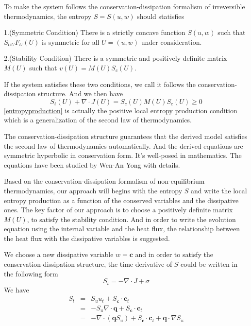 \documentclass[a4paper]{article}
\begin{document}
To make the system follows the conservation-dissipation formalism of irreversible thermodynamics, the entropy $S = S(u,w)$ should statisfies

1.(Symmetric Condition) There is a strictly concave function $S(u,w)$ such that $S_{UU} F_U(U)$ is symmetric for all $U=(u,w)$ under consideration.

2.(Stability Condition) There is a symmetric and positively definite matrix $M(U)$ such that $v(U)=M(U)S_c(U)$.

If the system satisfies these two conditions, we call it follows the conservation-dissipation structure. And we then have
\begin{equation}\label{entropyproduction}
S_t(U)+\nabla \cdot J(U)=S_c(U)M(U)S_c(U) \ge 0
\end{equation}
\eqref{entropyproduction} is actually the positive local entropy production condition which is a generalization of the second law of thermodynamics.

The  conservation-dissipation structure guarantees that the derived model satisfies the second law of thermodynamics automatically. And the derived equations are symmetric hyperbolic in conservation form. It's well-posed in mathematics\cite{friedrichs1971systems}. The equations have been studied by Wen-An Yong with details\cite{yong2008interesting,yong1999singular,kawashima2004dissipative}.


Based on the conservation-dissipation formalism of non-equilibrium thermodynamics, our approach will begins with the entropy $S$ and write the local entropy production as a function of the conserved variables and the dissipative ones. The key factor of our approach is to choose a positively definite matrix $M(U)$, to satisfy the stability condition. And in order to write the evolution equation using the internal variable and the heat flux, the relationship between the heat flux with the dissipative variables is suggested. 

We choose a new dissipative variable $w=\mathbf{c}$ and in order to satisfy the conservation-dissipation structure, the time derivative of $S$ could be written in the following form
\begin{equation}\label{St}
S_t=-\nabla \cdot J+\sigma
\end{equation}
We have
\begin{eqnarray}
S_t &=& S_u u_t + S_\mathbf{c} \cdot \mathbf{c}_t \\
 &=& -S_u \nabla \cdot \mathbf{q} +S_\mathbf{c} \cdot \mathbf{c}_t\\
&=& -\nabla \cdot(\mathbf{q}S_u)+S_\mathbf{c} \cdot \mathbf{c}_t+\mathbf{q} \cdot \nabla S_u
\end{eqnarray}
\end{document}
